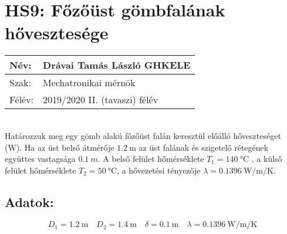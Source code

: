 
\section*{HS9: Főzőüst gömbfalának hővesztesége}
\begin{tabular}{ | p{2cm} | p{14cm} | } 
	\hline
	Név: & Drávai Tamás László GHKELE\\ 
	\hline
	Szak: & Mechatronikai mérnök \\ 
	\hline
	Félév: & 2019/2020 II. (tavaszi) félév \\ 
	\hline
\end{tabular}
\vspace{4mm} 
\\Határozzuk meg egy gömb alakú főzőüst falán keresztül előálló hőveszteséget (W).  Ha az üst belső átmérője $\SI{1,2}{\meter}$  az üst falának és szigetelő rétegének együttes vastagsága $\SI{0,1}{m}$. A belső felület hőmérséklete $T_1=\SI{140}{\celsius}$ , a külső felület hőmérséklete  $T_2=\SI{50}{\celsius}$,  a hővezetési tényezője $\lambda=\SI[per-mode=fraction]{0,1396}{\watt\per\meter\per\kelvin}$.
\subsection*{ {Adatok:}}
\begin{equation*}
D_1=\SI{1,2}{\meter}  \quad  D_2=\SI{1,4}{\meter} \quad \delta=\SI{0,1}{\meter}\quad
\lambda=\SI[per-mode=fraction]{0,1396}{\watt\per\meter\per\kelvin}
\end{equation*}
